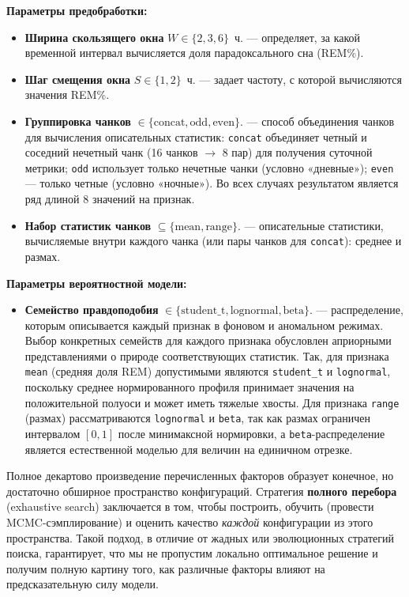\documentclass[14pt]{mmcs_article}
\begin{document}
\textbf{Параметры предобработки:}
\begin{itemize}
	\item \textbf{Ширина скользящего окна} $W \in \{2, 3, 6\}$~ч. —
	определяет, за какой временной интервал вычисляется доля
	парадоксального сна (REM\%).
	\item \textbf{Шаг смещения окна} $S \in \{1, 2\}$~ч. — 
	задает частоту, с которой вычисляются значения REM\%.
	\item \textbf{Группировка чанков}
	$\in \{\text{concat}, \text{odd}, \text{even}\}$. —
	способ объединения чанков для вычисления описательных
	статистик: \texttt{concat} объединяет четный и соседний
	нечетный чанк (16 чанков $\to$ 8 пар) для получения
	суточной метрики; \texttt{odd} использует только
	нечетные чанки (условно «дневные»); \texttt{even} —
	только четные (условно «ночные»). Во всех случаях
	результатом является ряд длиной 8 значений на признак.
	\item \textbf{Набор статистик чанков}
	$\subseteq \{\text{mean}, \text{range}\}$. —
	описательные статистики, вычисляемые внутри каждого чанка
	(или пары чанков для \texttt{concat}): среднее и размах.
\end{itemize}

\textbf{Параметры вероятностной модели:}
\begin{itemize}
	\item \textbf{Семейство правдоподобия}
	$\in \{\text{student\_t}, \text{lognormal}, \text{beta}\}$. —
	распределение, которым описывается каждый признак в фоновом
	и аномальном режимах. Выбор конкретных семейств для каждого
	признака обусловлен априорными представлениями о природе
	соответствующих статистик. Так, для признака \texttt{mean}
	(средняя доля REM) допустимыми являются \texttt{student\_t}
	и \texttt{lognormal}, поскольку среднее нормированного
	профиля принимает значения на положительной полуоси и может
	иметь тяжелые хвосты. Для признака \texttt{range} (размах)
	рассматриваются \texttt{lognormal} и \texttt{beta}, так как
	размах ограничен интервалом $[0, 1]$ после минимаксной
	нормировки, а \texttt{beta}-распределение является
	естественной моделью для величин на единичном отрезке.
\end{itemize}

Полное декартово произведение перечисленных факторов образует
конечное, но достаточно обширное пространство конфигураций.
Стратегия \textbf{полного перебора} (exhaustive search)
заключается в том, чтобы построить, обучить (провести
MCMC-сэмплирование) и оценить качество \textit{каждой}
конфигурации из этого пространства. Такой подход, в отличие от
жадных или эволюционных стратегий поиска, гарантирует, что мы
не пропустим локально оптимальное решение и получим полную
картину того, как различные факторы влияют на предсказательную
силу модели.
\end{document}

